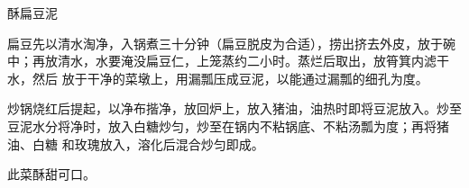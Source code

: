 %
%
%
%
%
%
%
\begin{recipe}{酥扁豆泥}

\ingredients


\preparation

\step 扁豆先以清水淘净，入锅煮三十分钟（扁豆脱皮为合适），捞出挤去外皮，放于碗
中；再放清水，水要淹没扁豆仁，上笼蒸约二小时。蒸烂后取出，放筲箕内滤干水，然后
放于干净的菜墩上，用漏瓢压成豆泥，以能通过漏瓢的细孔为度。

\step 炒锅烧红后提起，以净布揩净，放回炉上，放入猪油，油热时即将豆泥放入。炒至
豆泥水分将净时，放入白糖炒匀，炒至在锅内不粘锅底、不粘汤瓢为度；再将猪油、白糖
和玫瑰放入，溶化后混合炒匀即成。

\features

此菜酥甜可口。

\end{recipe}

